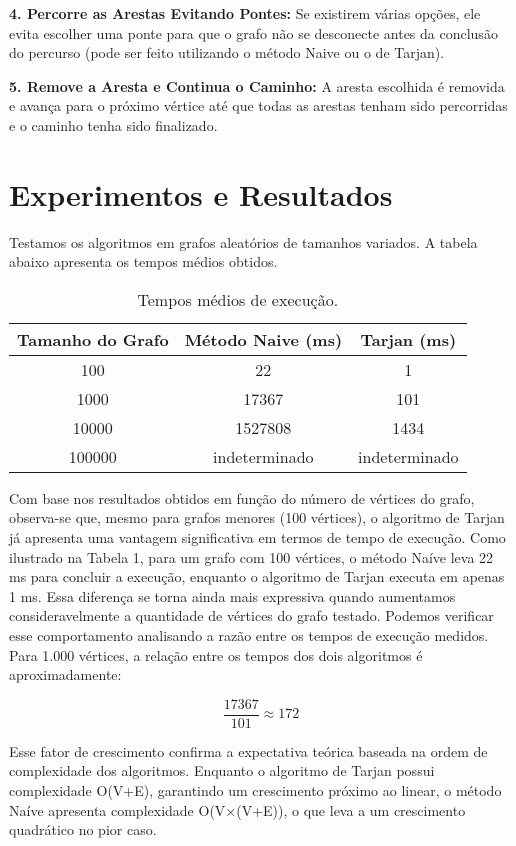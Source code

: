 \documentclass{article}
\begin{document}
\textbf{4. Percorre as Arestas Evitando Pontes:} Se existirem várias opções, ele evita escolher uma ponte para que o grafo não se desconecte antes da conclusão do percurso (pode ser feito utilizando o método Naive ou o de Tarjan).

\textbf{5. Remove a Aresta e Continua o Caminho:} A aresta escolhida é removida e avança para o próximo vértice até que todas as arestas tenham sido percorridas e o caminho tenha sido finalizado.


\section{Experimentos e Resultados}
Testamos os algoritmos em grafos aleat\'orios de tamanhos variados. A tabela abaixo apresenta os tempos m\'edios obtidos.

\begin{table}[H]
    \centering
    \begin{tabular}{ccc}
        \toprule
        \textbf{Tamanho do Grafo} & \textbf{M\'etodo Naive (ms)} & \textbf{Tarjan (ms)} \\
        \midrule
        100 & 22 & 1 \\
        1000 & 17367 & 101 \\
        10000 & 1527808 & 1434 \\
        100000 & indeterminado & indeterminado \\
        \bottomrule
    \end{tabular}
    \caption{Tempos m\'edios de execu\c{c}\~ao.}
    \label{tab:resultados}
\end{table}

Com base nos resultados obtidos em função do número de vértices do grafo, observa-se que, mesmo para grafos menores (100 vértices), o algoritmo de Tarjan já apresenta uma vantagem significativa em termos de tempo de execução.
Como ilustrado na Tabela 1, para um grafo com 100 vértices, o método Naíve leva 22 ms para concluir a execução, enquanto o algoritmo de Tarjan executa em apenas 1 ms. Essa diferença se torna ainda mais expressiva quando aumentamos consideravelmente a quantidade de vértices do grafo testado. Podemos verificar esse comportamento analisando a razão entre os tempos de execução medidos. Para 1.000 vértices, a relação entre os tempos dos dois algoritmos é aproximadamente:

\[
\frac {17367}{101} \approx 172
\]


Esse fator de crescimento confirma a expectativa teórica baseada na ordem de complexidade dos algoritmos. Enquanto o algoritmo de Tarjan possui complexidade O(V+E), garantindo um crescimento próximo ao linear, o método Naíve apresenta complexidade O(V×(V+E)), o que leva a um crescimento quadrático no pior caso.
\end{document}
